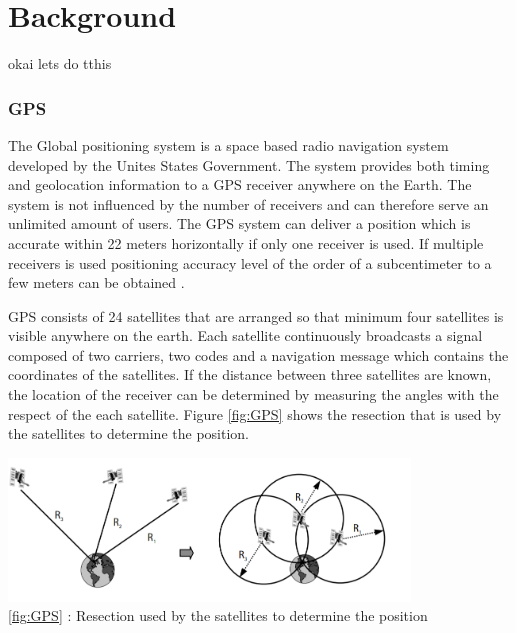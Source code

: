 

\chapter{Background}

okai lets do tthis

\subsection{GPS}
The Global positioning system is a space based radio navigation system developed by the Unites States Government.  The system provides both timing and geolocation information to a GPS receiver anywhere on the Earth.  The system is not influenced by the number of receivers and can therefore serve an unlimited amount of users. The GPS system can deliver a position which is accurate within 22 meters horizontally if only one receiver is used. If multiple receivers is used positioning accuracy level of the order of a subcentimeter to a few meters can be obtained \cite{GPS}.

GPS consists of 24 satellites that are arranged so that minimum four satellites is visible anywhere on the earth. Each satellite continuously broadcasts a signal composed of two carriers, two codes and a navigation message which contains the coordinates of the satellites.  If the distance between three satellites are known, the location of the receiver can be determined by measuring the angles with the respect of the each satellite.  Figure \ref{fig:GPS} shows the resection that is used by the satellites to determine the position.\\

\begin{minipage}[t]{0.8\textwidth}
    \centering
    \includegraphics[width=0.8\textwidth]{Images/gps.PNG}\\
    \caption{\ref{fig:GPS} : Resection used by the satellites to determine the position}
    \label{fig:GPS}
\end{minipage}
\\

